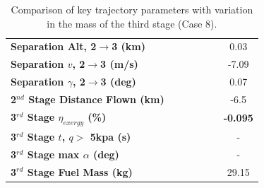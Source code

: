 \begin{table}[ht]
\begin{tabular}{l c c c c c c}
		\textbf{Separation Alt, 2$\rightarrow$3 (km)}
		& \secondthirdSeparationAltmThreeNinetyNoReturn
		& \secondthirdSeparationAltmThreeNinetyFiveNoReturn
		& \secondthirdSeparationAltmThreeStandardNoReturn
		& \secondthirdSeparationAltmThreeOneHundredFiveNoReturn
		& \secondthirdSeparationAltmThreeOneHundredTenNoReturn
		&0.03
		\\
		\textbf{Separation $v$, 2$\rightarrow$3 (m/s)}
		& \secondthirdSeparationvmThreeNinetyNoReturn
		& \secondthirdSeparationvmThreeNinetyFiveNoReturn
		& \secondthirdSeparationvmThreeStandardNoReturn
		& \secondthirdSeparationvmThreeOneHundredFiveNoReturn
		& \secondthirdSeparationvmThreeOneHundredTenNoReturn
		&-7.09
		\\
		\textbf{Separation $\gamma$, 2$\rightarrow$3 (deg)}
		& \secondthirdSeparationgammamThreeNinetyNoReturn
		& \secondthirdSeparationgammamThreeNinetyFiveNoReturn
		& \secondthirdSeparationgammamThreeStandardNoReturn
		& \secondthirdSeparationgammamThreeOneHundredFiveNoReturn
		& \secondthirdSeparationgammamThreeOneHundredTenNoReturn
		&0.07
		\\
	
		\textbf{2$^{nd}$ Stage Distance Flown (km)}
		& \SecondDistmThreeNinetyNoReturn
		& \SecondDistmThreeNinetyFiveNoReturn
		& \SecondDistmThreeStandardNoReturn
		& \SecondDistmThreeOneHundredFiveNoReturn
		& \SecondDistmThreeOneHundredTenNoReturn
		&-6.5
		\\
		\hline 
		\textbf{3$^{rd}$ Stage $\eta_{exergy}$ (\%)}
		& \textbf{\thirddExergyEffmThreeNinetyNoReturn}
		& \textbf{\thirddExergyEffmThreeNinetyFiveNoReturn}
		& \textbf{\thirddExergyEffmThreeStandardNoReturn}
		& \textbf{\thirddExergyEffmThreeOneHundredFiveNoReturn}
		& \textbf{\thirddExergyEffmThreeOneHundredTenNoReturn}
		& \textbf{-0.095}
		\\
	
		\textbf{3$^{rd}$ Stage $t$, $q >$ 5kpa (s)}
		& \thirdqOverFivemThreeNinetyNoReturn
		& \thirdqOverFivemThreeNinetyFiveNoReturn
		& \thirdqOverFivemThreeStandardNoReturn
		& \thirdqOverFivemThreeOneHundredFiveNoReturn
		& \thirdqOverFivemThreeOneHundredTenNoReturn
		& -
		\\
		\textbf{3$^{rd}$ Stage max $\alpha$ (deg)}
		& \thirdmaxAoAmThreeNinetyNoReturn
		& \thirdmaxAoAmThreeNinetyFiveNoReturn
		& \thirdmaxAoAmThreeStandardNoReturn
		& \thirdmaxAoAmThreeOneHundredFiveNoReturn
		& \thirdmaxAoAmThreeOneHundredTenNoReturn
		& -
		\\
		\textbf{3$^{rd}$ Stage Fuel Mass (kg)}
		& \thirdmFuelmThreeNinetyNoReturn
		& \thirdmFuelmThreeNinetyFiveNoReturn
		& \thirdmFuelmThreeStandardNoReturn
		& \thirdmFuelmThreeOneHundredFiveNoReturn
		& \thirdmFuelmThreeOneHundredTenNoReturn
		&29.15
		\\
		\hline 
	\end{tabular} 
	\caption{Comparison of key trajectory parameters with variation in the mass of the third stage (Case 8).}
	\label{tab:comparison80}
\end{table}


